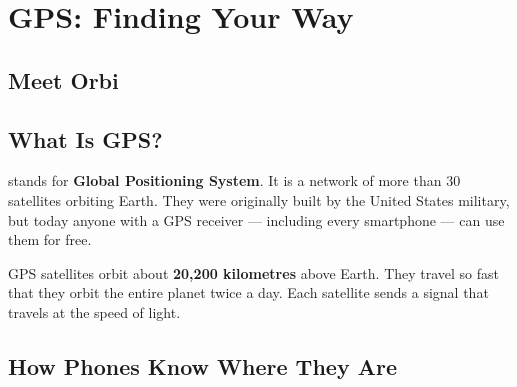 
\chapter{GPS: Finding Your Way}


\section*{Meet Orbi}


\sectionrule

\section*{What Is GPS?}

 stands for \textbf{Global Positioning System}.
It is a network of more than 30 satellites orbiting Earth.
They were originally built by the United States military,
but today anyone with a GPS receiver — including every smartphone — can use them for free.

\begin{funfact}
  GPS satellites orbit about \textbf{20,200 kilometres} above Earth.
  They travel so fast that they orbit the entire planet twice a day.
  Each satellite sends a signal that travels at the speed of light.
\end{funfact}

\sectionrule

\section*{How Phones Know Where They Are}

